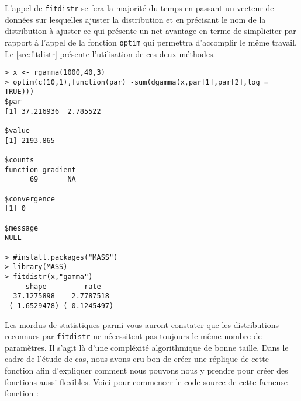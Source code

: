 L'appel de \texttt{fitdistr} se fera la majorité du temps en passant un vecteur de données sur lesquelles ajuster la distribution et en précisant le nom de la distribution à ajuster ce qui présente un net avantage en terme de simpliciter par rapport à l'appel de la fonction \texttt{optim} qui permettra d'accomplir le même travail. Le \autoref{src:fitdistr} présente l'utilisation de ces deux méthodes. \\

\begin{lstlisting}[caption = Ajustement de distribution sur données empiriques,label=src:fitdistr]
> x <- rgamma(1000,40,3)
> optim(c(10,1),function(par) -sum(dgamma(x,par[1],par[2],log = TRUE)))
$par
[1] 37.216936  2.785522

$value
[1] 2193.865

$counts
function gradient 
      69       NA 

$convergence
[1] 0

$message
NULL

> #install.packages("MASS")
> library(MASS)
> fitdistr(x,"gamma")
     shape         rate   
  37.1275898    2.7787518 
 ( 1.6529478) ( 0.1245497)
\end{lstlisting}

Les mordus de statistiques parmi vous auront constater que les distributions reconnues par \texttt{fitdistr} ne nécessitent pas toujours le même nombre de paramètres. Il s'agit là d'une compléxité algorithmique de bonne taille. Dans le cadre de l'étude de cas, nous avons cru bon de créer une réplique de cette fonction afin d'expliquer comment nous pouvons nous y prendre pour créer des fonctions aussi flexibles. Voici pour commencer le code source de cette fameuse fonction : \\

